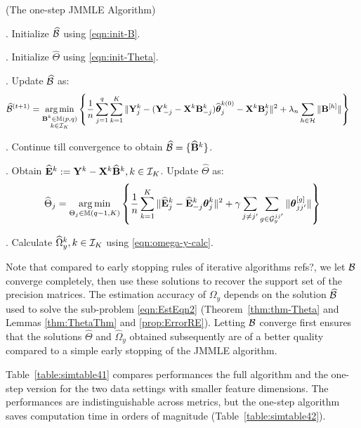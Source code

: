 \begin{Algorithm}
(The one-step JMMLE Algorithm)
\label{algo:jmmle-algo-1step}

. Initialize $\widehat {{\cal{B}}}$ using \eqref{eqn:init-B}.

. Initialize $\widehat \Theta$ using \eqref{eqn:init-Theta}.

. Update $\widehat {{\cal{B}}}$ as:
%
\begin{align*}
\widehat {{\cal{B}}}^{(t+1)} &= \operatorname*{arg\,min}_{\substack{{\mathbf{B}}^k \in {\mathbb{M}}(p,q)\\k \in {\cal{I}}_K}} \left\{ \frac{1}{n} \sum_{j=1}^q \sum_{k=1}^K \| {\mathbf{Y}}^k_j - ({\mathbf{Y}}_{-j}^k - {\mathbf{X}}^k {\mathbf{B}}_{-j}^k) \widehat {{\boldsymbol{\theta}}}_j^{k (0)} - {\mathbf{X}}^k {\mathbf{B}}_j^{k } \|^2
+ \lambda_n \sum_{h \in {\cal{H}}} \| {\mathbf{B}}^{[h]} \| \right\}
\end{align*}

. Continue till convergence to obtain $\widehat {{\cal{B}}} = \{ \widehat {{\mathbf{B}}}^k \}$.

. Obtain $\widehat {{\mathbf{E}}}^k := {\mathbf{Y}}^k - {\mathbf{X}}^k \widehat {{\mathbf{B}}}^k, k \in {\cal{I}}_K$. Update $\widehat \Theta$ as:
%
\begin{align*}
\widehat \Theta_j = \operatorname*{arg\,min}_{\Theta_j \in {\mathbb{M}}(q-1, K)}
\left\{ \frac{1}{n} \sum_{k=1}^K
\| \widehat {{\mathbf{E}}}_j^k - \widehat {{\mathbf{E}}}_{-j}^k {\boldsymbol{\theta}}_j^k \|^2
+ \gamma \sum_{j \neq j'} \sum_{g \in {\cal{G}}_y^{jj'}} \| {\boldsymbol{\theta}}_{jj'}^{[g]} \| \right\}
\end{align*}

. Calculate $\widehat \Omega_y^k, k \in {\cal{I}}_K$ using \eqref{eqn:omega-y-calc}.
\end{Algorithm}

Note that compared to early stopping rules of iterative algorithms \citep{} {\colrbf refs?}, we let ${\cal{B}}$ converge completely, then use these solutions to recover the support set of the precision matrices. The estimation accuracy of $\Omega_y$ depends on the solution $\widehat {{\cal{B}}}$ used to solve the sub-problem \eqref{eqn:EstEqn2} (Theorem~\ref{thm:thm-Theta} and Lemmas \ref{thm:ThetaThm} and \ref{prop:ErrorRE}). Letting ${\cal{B}}$ converge first ensures that the solutions $\widehat \Theta$ and $\widehat \Omega_y$ obtained subsequently are of a better quality compared to a simple early stopping of the JMMLE algorithm.

Table~\ref{table:simtable41} compares performances the full algorithm and the one-step version for the two data settings with smaller feature dimensions. The performances are indistinguishable across metrics, but the one-step algorithm saves computation time in orders of magnitude (Table~\ref{table:simtable42}).

